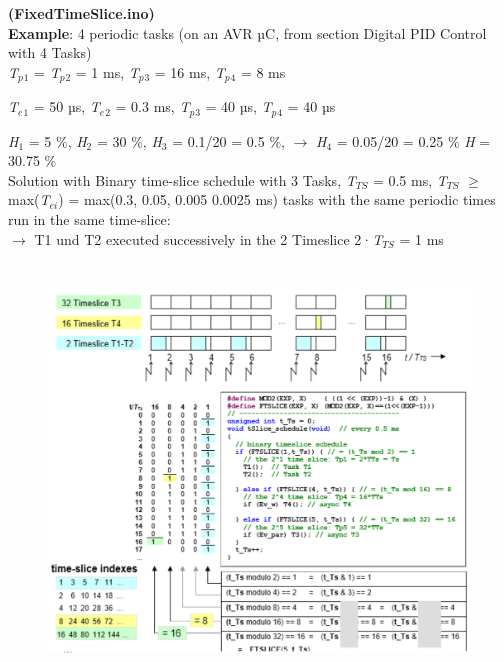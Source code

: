 \textbf{  (FixedTimeSlice.ino)}\\
\newpage
\textbf{Example}: 4 periodic tasks (on an AVR µC, from section Digital PID Control with 4 Tasks) \\

\textit{T${}_{p}$}${}_{1}$ = \textit{T${}_{p}$}${}_{2}$ = 1 ms, \textit{T${}_{p}$}${}_{3}$ = 16 ms, \textit{T${}_{p}$}${}_{4}$ = 8 ms

\textit{T${}_{e}$}${}_{1}$ = 50 µs, \textit{T${}_{e}$}${}_{2}$ = 0.3 ms, \textit{T${}_{p}$}${}_{3}$ = 40 µs, \textit{T${}_{p}$}${}_{4}$ = 40 µs

\textit{H}${}_{1}$ = 5 \%, \textit{H}${}_{2}$ = 30 \%, \textit{H}${}_{3}$ = 0.1/20 = 0.5 \%, $\rightarrow$ \textit{H}${}_{4}$ = 0.05/20 = 0.25 \%  \textit{H} = 30.75 \%\\

Solution with Binary time-slice schedule with 3 Tasks, \textit{T${}_{TS}$} = 0.5 ms, \textit{T${}_{TS}$} $\mathrm{\ge}$ max(\textit{T${}_{ei}$}) = max(0.3, 0.05, 0.005 0.0025 ms) tasks with the same periodic times run in the same time-slice:\\
 $\rightarrow$ T1 und T2 executed successively in the 2 Timeslice 2·\textit{T${}_{TS}$ }= 1 ms\\
 
 
 	\begin{figure}[h]
    \centering
    \includegraphics[width=15cm, height=11cm]{Images/image96.png}
    \label{fig:Fig 41}
    \end{figure}

